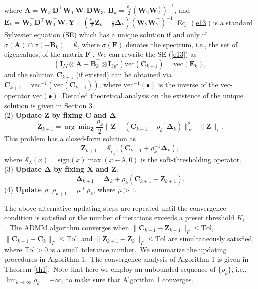 where $\bm{A}=\bm{W}_{3}^{\top}\bm{D}^{\top}\bm{W}_{1}^{\top}\bm{W}_{1}\bm{D}\bm{W}_{3}$, $\bm{B}_{k}=\frac{\rho_{k}}{2}(\bm{W}_{2}\bm{W}_{2}^{\top})^{-1}$, and $\bm{E}_{k}=\bm{W}_{3}^{\top}\bm{D}^{\top}\bm{W}_{1}^{\top}\bm{W}_{1}\bm{Y}+(\frac{\rho_{k}}{2}\bm{Z}_{k} -\frac{1}{2}\bm{\Delta}_{k})(\bm{W}_{2}\bm{W}_{2}^{\top})^{-1}$. Eq.\ (\ref{e13}) is a standard Sylvester equation (SE) which has a unique solution if and only if $\sigma(\bm{A})\cap\sigma(-\bm{B}_{k})=\emptyset$, where $\sigma(\bm{F})$ denotes the spectrum, i.e., the set of eigenvalues, of the matrix $\bm{F}$ \cite{simoncini2016computational}. We can rewrite the SE (\ref{e13}) as 
\begin{equation}
\label{e14}
(\bm{I}_{M}\otimes\bm{A}
+
\bm{B}_{k}^{\top}\otimes\bm{I}_{3p^2})\text{vec}(\bm{C}_{k+1})
=
\text{vec}(\bm{E}_{k}),
\end{equation}
and the solution $\bm{C}_{k+1}$ (if existed) can be obtained via $\bm{C}_{k+1}=\text{vec}^{-1}(\text{vec}(\bm{C}_{k+1}))$, where $\text{vec}^{-1}(\bullet)$ is the inverse of the vec-operator $\text{vec}(\bullet)$.
Detailed theoretical analysis on the existence of the unique solution is given in Section 3.
\vspace{1mm}
\\
(2) \textbf{Update $\bm{Z}$ by fixing $\bm{C}$ and $\bm{\Delta}$}:
\begin{equation}
\label{e15}
\bm{Z}_{k+1}
=
\arg\min\nolimits_{\bm{Z}}\frac{\rho_{k}}{2}
\|\bm{Z} - (\bm{C}_{k+1}+\rho_{k}^{-1}\bm{\Delta}_{k})\|_{F}^{2}
+
\|\bm{Z}\|_{1}.
\end{equation}
This problem has a closed-form solution as 
\begin{equation}
\label{e16}
\bm{Z}_{k+1}
=
\mathcal{S}_{\rho_{k}^{-1}}(\bm{C}_{k+1}+\rho_{k}^{-1}\bm{\Delta}_{k}),
\end{equation}
where $\mathcal{S}_{\lambda}(x) = \text{sign}(x)\max(x-\lambda, 0)$ is the soft-thresholding operator.
\vspace{1mm}
\\
(3) \textbf{Update $\bm{\Delta}$ by fixing $\bm{X}$ and $\bm{Z}$}:
\begin{equation}
\label{e17}
\bm{\Delta}_{k+1}
=
\bm{\Delta}_{k} + \rho_{k}(\bm{C}_{k+1}-\bm{Z}_{k+1}).
\end{equation}
(4) \textbf{Update $\rho$}: $\rho_{k+1}= \mu*\rho_{k}$, where $\mu>1$.
\vspace{1mm}

The above alternative updating steps are repeated until the convergence condition is satisfied or the number of iterations exceeds a preset threshold $K_{1}$.\ The ADMM algorithm converges when $\|\bm{C}_{k+1}-\bm{Z}_{k+1}\|_{F}\le \text{Tol}$, $\|\bm{C}_{k+1}-\bm{C}_{k}\|_{F}\le \text{Tol}$, and $\|\bm{Z}_{k+1}-\bm{Z}_{k}\|_{F}\le \text{Tol}$ are simultaneously satisfied, where $\text{Tol}>0$ is a small tolerance number.\ We summarize the updating procedures in Algorithm 1.\ The convergence analysis of Algorithm 1 is given in Theorem \ref{th1}.\ Note that here we employ an unbounded sequence of $\{\rho_{k}\}$, i.e., $\lim_{k \to \infty} \rho_{k}=+\infty$, to make sure that Algorithm 1 converges. 


